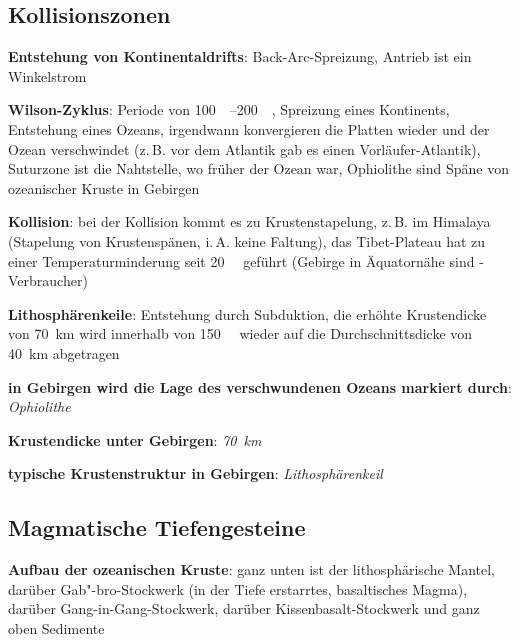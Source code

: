 \pagebreak

\subsection{%
    Kollisionszonen%
}

\textbf{Entstehung von Kontinentaldrifts}:
Back-Arc-Spreizung,
Antrieb ist ein Winkelstrom

\textbf{Wilson-Zyklus}:
Periode von \SIrange{100}{200}{\mega\year},
Spreizung eines Kontinents,
Entstehung eines Ozeans,
irgendwann konvergieren die Platten wieder und der Ozean verschwindet
(z.\,B. vor dem Atlantik gab es einen Vorläufer-Atlantik),
Suturzone ist die Nahtstelle, wo früher der Ozean war,
Ophiolithe sind Späne von ozeanischer Kruste in Gebirgen

\textbf{Kollision}:
bei der Kollision kommt es zu Krustenstapelung, z.\,B. im Himalaya
(Stapelung von Krustenspänen, i.\,A. keine Faltung),
das Tibet-Plateau hat zu einer Temperaturminderung seit \SI{20}{\mega\year} geführt
(Gebirge in Äquatornähe sind -Verbraucher)

\textbf{Lithosphärenkeile}:
Entstehung durch Subduktion,
die erhöhte Krustendicke von \SI{70}{\kilo\meter} wird innerhalb von
\SI{150}{\mega\year} wieder auf die Durchschnittsdicke von \SI{40}{\kilo\meter} abgetragen

\begin{wichtig}
    \item
    \textbf{in Gebirgen wird die Lage des verschwundenen Ozeans markiert durch}:\\
    \emph{Ophiolithe}
    
    \item
    \textbf{Krustendicke unter Gebirgen}:
    \emph{\SI[math-rm=\mathit,text-rm=\itshape]{70}{\kilo\meter}}
    
    \item
    \textbf{typische Krustenstruktur in Gebirgen}:
    \emph{Lithosphärenkeil}
\end{wichtig}

\subsection{%
    Magmatische Tiefengesteine%
}

\textbf{Aufbau der ozeanischen Kruste}:
ganz unten ist der lithosphärische Mantel,
darüber Gab"-bro-Stockwerk (in der Tiefe erstarrtes, basaltisches Magma),
darüber Gang-in-Gang-Stockwerk,
darüber Kissenbasalt-Stockwerk und
ganz oben Sedimente

